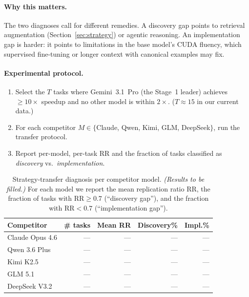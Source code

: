 \documentclass{article}
\begin{document}
\paragraph{Why this matters.}
The two diagnoses call for different remedies. A discovery gap points
to retrieval augmentation (Section~\ref{sec:strategy}) or agentic
reasoning. An implementation gap is harder: it points to limitations
in the base model's CUDA fluency, which supervised fine-tuning or
longer context with canonical examples may fix.

\paragraph{Experimental protocol.}
\begin{enumerate}
  \item Select the $T$ tasks where Gemini~3.1~Pro (the Stage~1
        leader) achieves $\geq 10\times$ speedup and no other model
        is within $2\times$. ($T \approx 15$ in our current data.)
  \item For each competitor $M \in \{$Claude, Qwen, Kimi, GLM,
        DeepSeek$\}$, run the transfer protocol.
  \item Report per-model, per-task RR and the fraction of tasks
        classified as \emph{discovery} vs.\ \emph{implementation}.
\end{enumerate}

\begin{table}[ht]
\centering
\small
\begin{tabular}{@{}lrrrr@{}}
\toprule
\textbf{Competitor} & \textbf{\# tasks} & \textbf{Mean RR} & \textbf{Discovery\%} & \textbf{Impl.\%} \\
\midrule
Claude Opus 4.6 & --- & --- & --- & --- \\
Qwen 3.6 Plus    & --- & --- & --- & --- \\
Kimi K2.5        & --- & --- & --- & --- \\
GLM 5.1          & --- & --- & --- & --- \\
DeepSeek V3.2    & --- & --- & --- & --- \\
\bottomrule
\end{tabular}
\caption{Strategy-transfer diagnosis per competitor model.
\emph{(Results to be filled.)} For each model we report the mean
replication ratio $\mathrm{RR}$, the fraction of tasks with
$\mathrm{RR} \geq 0.7$ (``discovery gap''), and the fraction with
$\mathrm{RR} < 0.7$ (``implementation gap'').}
\label{tab:transfer}
\end{table}
\end{document}

